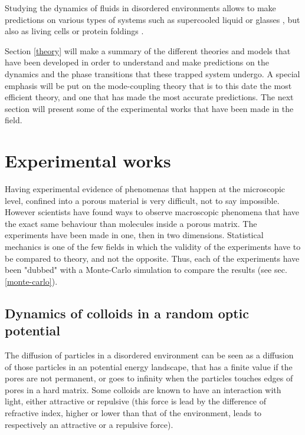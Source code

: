 \documentclass[a4paper,12pt]{article}
\newcommand{\jline}{\vspace{10pt}}
\begin{document}
Studying the dynamics of fluids in disordered environments allows to make predictions on various types of systems such as supercooled 
liquid \cite{} or glasses \cite{}, but also as living cells \cite{} or protein foldings \cite{}.\jline

Section \ref{theory} will make a summary of the different theories and models that have been developed in order to understand and make 
predictions on the dynamics and the phase transitions that these trapped system undergo. A special emphasis will be put on the mode-coupling
theory that is to this date the most efficient theory, and one that has made the most accurate predictions.
The next section will present some of the experimental works that have been made in the field.\jline

\section{Experimental works}
\label{exp}

Having experimental evidence of phenomenas that happen at the microscopic level, confined into a porous material is very difficult, not to 
say impossible. However scientists have found ways to observe macroscopic phenomena that have the exact same behaviour than molecules inside
a porous matrix. The experiments have been made in one, then in two dimensions. Statistical mechanics is one of the few fields in which the 
validity of the experiments have to be compared to theory, and not the opposite. Thus, each of the experiments have been "dubbed" with a 
Monte-Carlo simulation to compare the results (see sec. \ref{monte-carlo}).

\subsection{Dynamics of colloids in a random optic potential}

The diffusion of particles in a disordered environment can be seen as a diffusion of those particles in an potential energy landscape, that 
has a finite value if the pores are not permanent, or goes to infinity when the particles touches edges of pores in a hard matrix. Some 
colloids are known to have an interaction with light, either attractive or repulsive (this force is lead by the difference of refractive index,
higher or lower than that of the environment, leads to respectively an attractive or a repulsive force).\jline
\end{document}
